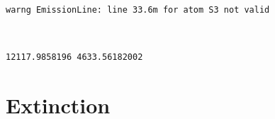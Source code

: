 \documentclass{report}
\begin{document}
    \begin{Verbatim}[commandchars=\\\{\}]
warng EmissionLine: line 33.6m for atom S3 not valid
    \end{Verbatim}

    \begin{center}
    \end{center}
    { \hspace*{\fill} \\}
    
    \begin{Verbatim}[commandchars=\\\{\}]
12117.9858196 4633.56182002
    \end{Verbatim}


    \section{Extinction}
\end{document}
